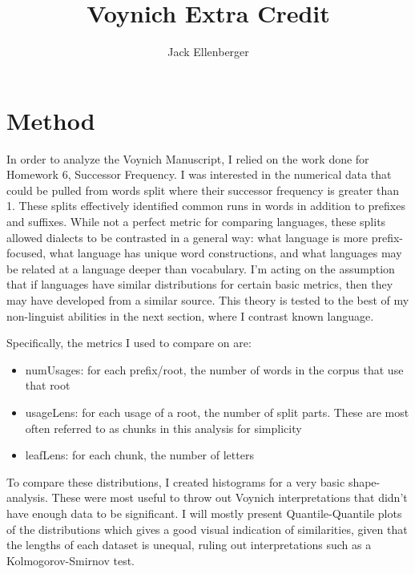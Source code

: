 \documentclass{article}
\newcommand{\hmwkTitle}{Voynich Extra Credit} %
\begin{document}
\title{\hmwkTitle}
\author{Jack Ellenberger}

\maketitle



\section{Method}


In order to analyze the Voynich Manuscript, I relied on the work done for Homework 6, Successor Frequency. I was interested in the numerical data that could be pulled from words split where their successor frequency is greater than 1. These splits effectively identified common runs in words in addition to prefixes and suffixes. While not a perfect metric for comparing languages, these splits allowed dialects to be contrasted in a general way: what language is more prefix-focused, what language has unique word constructions, and what languages may be related at a language deeper than vocabulary. I'm acting on the assumption that if languages have similar distributions for certain basic metrics, then they may have developed from a similar source. This theory is tested to the best of my non-linguist abilities in the next section, where I contrast known language. 


Specifically, the metrics I used to compare on are:
\begin{itemize}
\item numUsages: for each prefix/root, the number of words in the corpus that use that root
\item usageLens: for each usage of a root, the number of split parts. These are most often referred to as chunks in this analysis for simplicity
\item leafLens: for each chunk, the number of letters
\end{itemize}


To compare these distributions, I created histograms for a very basic shape-analysis. These were most useful to throw out Voynich interpretations that didn't have enough data to be significant. I will mostly present Quantile-Quantile plots of the distributions which gives a good visual indication of similarities, given that the lengths of each dataset is unequal, ruling out interpretations such as a Kolmogorov-Smirnov test.
\end{document}
